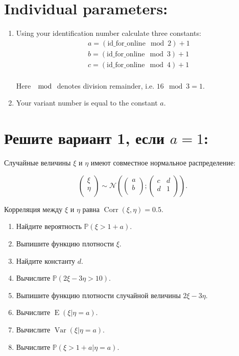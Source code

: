 \documentclass[12pt]{article}
\DeclareMathOperator{\Corr}{Corr}
\DeclareMathOperator{\Var}{Var}
\DeclareMathOperator{\E}{E}
\def \cN{\mathcal{N}}
\def \P{\mathbb{P}}
\def \id {\mathrm{id}\_\mathrm{for}\_\mathrm{online}}
\begin{document}
\section*{Individual parameters:}

\begin{enumerate}
\item Using your identification number calculate three constants:
\begin{align*}
  a = (\id \mod 2) + 1 \\
  b = (\id \mod 3) + 1 \\
  c = (\id \mod 4) + 1 \\
\end{align*}

Here $\mod$ denotes division remainder, i.e. $16 \mod 3 = 1$.

\item Your variant number is equal to the constant $a$.
\end{enumerate}


\newpage

\section*{Решите вариант 1, если $a=1$:}

Случайные величины $\xi$ и $\eta$ имеют совместное нормальное распределение:

\[
\begin{pmatrix}
  \xi \\
  \eta \\
\end{pmatrix}   \sim 
\cN \left(
\begin{pmatrix}
a \\
b \\
\end{pmatrix};
\begin{pmatrix}
  c & d \\
  d & 1 \\
\end{pmatrix}
\right).
\]

Корреляция между $\xi$ и $\eta$ равна $\Corr(\xi, \eta)= 0.5$.


\begin{enumerate}
\item Найдите вероятность $\P(\xi > 1 + a)$.
\item Выпишите функцию плотности $\xi$.
\item Найдите константу $d$. 
\item Вычислите $\P(2\xi -3\eta >10)$.
\item Выпишите функцию плотности случайной величины $2\xi -3\eta$.
\item Вычислите $\E(\xi |\eta = a)$.
\item Вычислите $\Var(\xi |\eta = a)$.
\item Вычислите $\P(\xi > 1+ a |\eta = a)$.
\end{enumerate}
\end{document}
